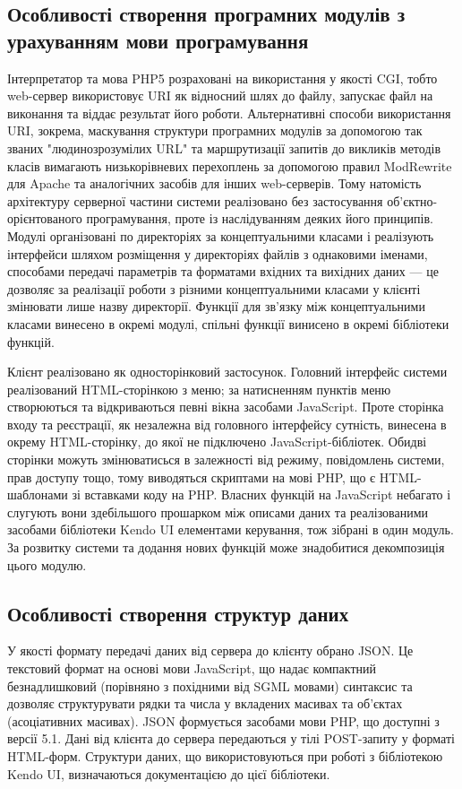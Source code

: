 \subsection{Особливості створення програмних модулів з урахуванням мови програмування}
\bigbreak
\begin{sloppy}
Інтерпретатор та мова PHP5 розраховані на використання у якості CGI, тобто web-сервер використовує URI як відносний шлях до файлу, запускає файл на виконання та віддає результат його роботи. Альтернативні способи використання URI, зокрема, маскування структури програмних модулів за допомогою так званих "людинозрозумілих URL" та маршрутизації запитів до викликів методів класів вимагають низькорівневих перехоплень за допомогою правил ModRewrite для Apache та аналогічних засобів для інших web-серверів. Тому натомість архітектуру серверної частини системи реалізовано без застосування об'єктно-орієнтованого програмування, проте із наслідуванням деяких його принципів. Модулі організовані по директоріях за концептуальними класами і реалізують інтерфейси шляхом розміщення у директоріях файлів з однаковими іменами, способами передачі параметрів та форматами вхідних та вихідних даних --- це дозволяє за реалізації роботи з різними концептуальними класами у клієнті змінювати лише назву директорії. Функції для зв'язку між концептуальними класами винесено в окремі модулі, спільні функції винисено в окремі бібліотеки функцій.

Клієнт реалізовано як односторінковий застосунок. Головний інтерфейс системи реалізований HTML-сторінкою з меню; за натисненням пунктів меню створюються та відкриваються певні вікна засобами JavaScript. Проте сторінка входу та реєстрації, як незалежна від головного інтерфейсу сутність, винесена в окрему HTML-сторінку, до якої не підключено JavaScript-бібліотек. Обидві сторінки можуть змінюватисься в залежності від режиму, повідомлень системи, прав доступу тощо, тому виводяться скриптами на мові PHP, що є HTML-шаблонами зі вставками коду на PHP. Власних функцій на JavaScript небагато і слугують вони здебільшого прошарком між описами даних та реалізованими засобами бібліотеки Kendo UI елементами керування, тож зібрані в один модуль. За розвитку системи та додання нових функцій може знадобитися декомпозиція цього модулю.
\end{sloppy}
\bigbreak
\subsection{Особливості створення структур даних}
\bigbreak
У якості формату передачі даних від сервера до клієнту обрано JSON. Це текстовий формат на основі мови JavaScript, що надає компактний безнадлишковий (порівняно з похідними від SGML мовами) синтаксис та дозволяє структурувати рядки та числа у вкладених масивах та об'єктах (асоціативних масивах). JSON формується засобами мови PHP, що доступні з версії 5.1. Дані від клієнта до сервера передаються у тілі POST-запиту у форматі HTML-форм. Структури даних, що використовуються при роботі з бібліотекою Kendo UI, визначаються документацією до цієї бібліотеки.
